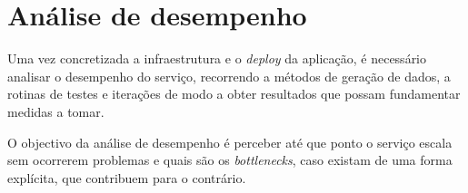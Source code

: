 \chapter[Análise de desempenho]
{An\'alise de desempenho}

Uma vez concretizada a infraestrutura e o \emph{deploy} da aplicação, é necessário analisar o desempenho do serviço, recorrendo a métodos de geração de dados, a rotinas de testes e iterações de modo a obter resultados que possam fundamentar medidas a tomar.

O objectivo da análise de desempenho é perceber até que ponto o serviço escala sem ocorrerem problemas e quais são os \emph{bottlenecks}, caso existam de uma forma explícita, que contribuem para o contrário.






